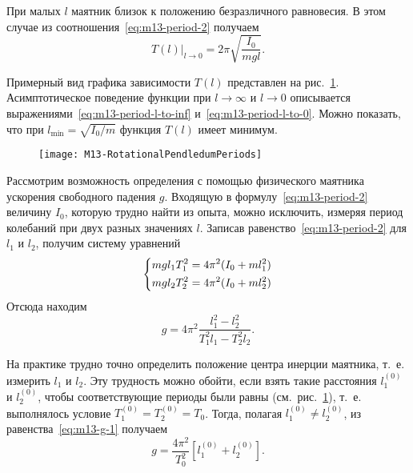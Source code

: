 \documentclass[a4paper, 12pt]{extarticle}
\begin{document}
При малых $l$ маятник близок к положению безразличного равновесия. В этом случае из соотношения~\eqref{eq:m13-period-2} получаем
\begin{equation}
\label{eq:m13-period-l-to-0}
\left. T(l) \right|_{l \to 0} = 2 \pi \sqrt{\frac{I_0}{mgl}}.
\end{equation}

Примерный вид графика зависимости $T(l)$ представлен на рис.~\ref{fig:m13-plot}. Асимптотическое поведение функции при $l \to \infty$ и $l \to 0$ описывается выражениями~\eqref{eq:m13-period-l-to-inf} и~\eqref{eq:m13-period-l-to-0}. Можно показать, что при $l_{\min} = \sqrt{I_0 / m}$ функция $T(l)$ имеет минимум. %

\begin{figure}[h]
\begin{center}
\texttt{[image: M13-RotationalPendledumPeriods]}
\end{center}
\caption{\label{fig:m13-plot}}
\end{figure}

Рассмотрим возможность определения с помощью физического маятника ускорения свободного падения $g$. Входящую в формулу~\eqref{eq:m13-period-2} величину $I_0$, которую трудно найти из опыта, можно исключить, измеряя период колебаний при двух разных значениях $l$. Записав равенство~\eqref{eq:m13-period-2} для $l_1$ и $l_2$, получим систему уравнений %
\begin{equation}
\label{eq:m13-system}
\left\{ \aligned
m g l_1 T_1^2 = 4 \pi^2 (I_0 + m l_1^2) \\
m g l_2 T_2^2 = 4 \pi^2 (I_0 + m l_2^2)
\endaligned \right.
\end{equation}
Отсюда находим
\begin{equation}
\label{eq:m13-g-1}
g = 4 \pi^2 \frac{l_1^2 - l_2^2}{T_1^2 l_1 - T_2^2 l_2}.
\end{equation}

На практике трудно точно определить положение центра инерции маятника, т.~е. измерить $l_1$ и $l_2$. Эту трудность можно обойти, если взять такие расстояния $l_1^{(0)}$ и $l_2^{(0)}$, чтобы соответствующие периоды были равны (см.~рис.~\ref{fig:m13-plot}), т.~е. выполнялось условие $T_1^{(0)} = T_2^{(0)} = T_0$. Тогда, полагая $l_1^{(0)} \ne l_2^{(0)}$, из равенства~\eqref{eq:m13-g-1} получаем %
\begin{equation}
\label{eq:m13-g-2}
g = \frac{4 \pi^2}{T_0^2} \left[ l_1^{(0)} + l_2^{(0)} \right] .
\end{equation}
\end{document}
